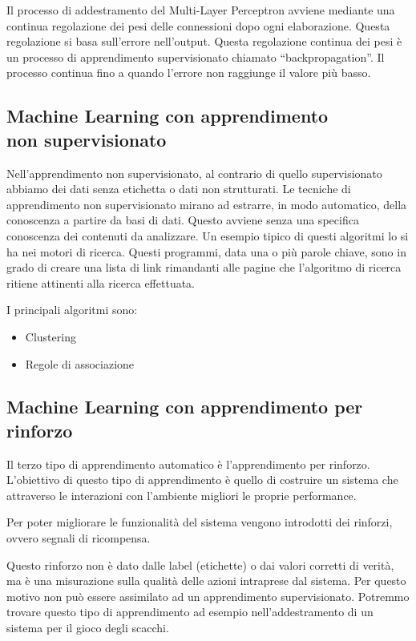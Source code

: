 \documentclass[12pt,italian]{report}
\begin{document}
Il processo di addestramento del Multi-Layer Perceptron avviene mediante una continua regolazione dei pesi delle connessioni dopo ogni elaborazione. Questa regolazione si basa sull'errore nell'output. Questa regolazione continua dei pesi è un processo di apprendimento supervisionato chiamato ``backpropagation''.
Il processo continua fino a quando l'errore non raggiunge il valore più basso.
\subsection{Machine Learning con apprendimento\\ non supervisionato}
Nell’apprendimento non supervisionato, al contrario di quello supervisionato abbiamo dei dati senza etichetta o dati non strutturati. Le tecniche di apprendimento non supervisionato mirano ad estrarre, in modo automatico, della conoscenza a partire da basi di dati. Questo avviene senza una specifica conoscenza dei contenuti da analizzare. Un esempio tipico di questi algoritmi lo si ha nei motori di ricerca. Questi programmi, data una o più parole chiave, sono in grado di creare una lista di link rimandanti alle pagine che l'algoritmo di ricerca ritiene attinenti alla ricerca effettuata.

I principali algoritmi sono:
\begin{itemize}
	\item Clustering
	\item Regole di associazione
\end{itemize}
\subsection{Machine Learning con apprendimento per rinforzo}
Il terzo tipo di apprendimento automatico è l’apprendimento per rinforzo. L’obiettivo di questo tipo di apprendimento è quello di costruire un sistema che attraverso le interazioni con l’ambiente migliori le proprie performance.

Per poter migliorare le funzionalità del sistema vengono introdotti dei rinforzi, ovvero segnali di ricompensa.

Questo rinforzo non è dato dalle label (etichette) o dai valori corretti di verità, ma è una misurazione sulla qualità delle azioni intraprese dal sistema. Per questo motivo non può essere assimilato ad un apprendimento supervisionato.
Potremmo trovare questo tipo di apprendimento ad esempio nell’addestramento di un sistema per il gioco degli scacchi.
\end{document}
